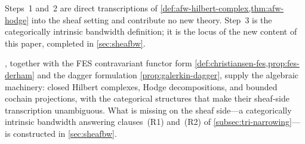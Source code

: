 Steps~1 and~2 are direct transcriptions of \cite{AFW2010}
\cref{def:afw-hilbert-complex,thm:afw-hodge} into the sheaf setting
and contribute no new theory. Step~3 is the categorically intrinsic
bandwidth definition; it is the locus of the new content of this
paper, completed in \cref{sec:sheafbw}.

, together
with the FES contravariant functor form
\cref{def:christiansen-fes,prop:fes-derham} and the dagger
formulation \cref{prop:galerkin-dagger}, supply the algebraic
machinery: closed Hilbert complexes, Hodge decompositions, and
bounded cochain projections, with the categorical structures that
make their sheaf-side transcription unambiguous. What is missing on
the sheaf side---a categorically intrinsic bandwidth answering
clauses~\textup{(R1)} and~\textup{(R2)} of
\cref{subsec:tri-narrowing}---is constructed in
\cref{sec:sheafbw}.

